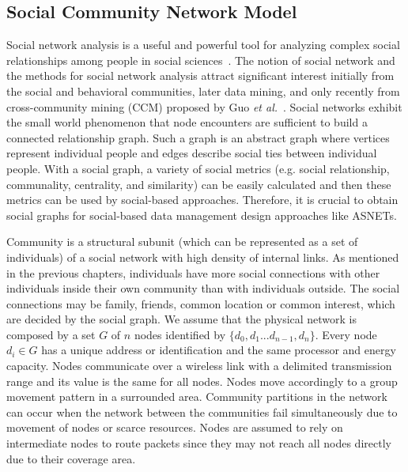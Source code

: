 \subsection{Social Community Network Model}\label{Chap4_03_01}
Social network analysis is a useful and powerful tool for analyzing complex social relationships among people in social sciences~\cite{OSerrat2009}. The notion of social network and the methods for social network analysis attract significant interest initially from the social and behavioral communities, later data mining, and only recently from cross-community mining (CCM) proposed by Guo {\it et al.}~\cite{BGuo2012}. Social networks exhibit the small world phenomenon that node encounters are sufficient to build a connected relationship graph. Such a graph is an abstract graph where vertices represent individual people and edges describe social ties between individual people. With a social graph, a variety of social metrics (e.g. social relationship, communality, centrality, and similarity) can be easily calculated and then these metrics can be used by social-based approaches. Therefore, it is crucial to obtain social graphs for social-based data management design approaches like ASNETs.

Community is a structural subunit (which can be represented as a set of individuals) of a social network with high density of internal links. As mentioned in the previous chapters, individuals have more social connections with other individuals inside their own community than with individuals outside. The social connections may be family, friends, common location or common interest, which are decided by the social graph. We assume that the physical network is composed by a set $G$ of $n$ nodes identified by $\{d_0, d_1 ... d_{n-1}, d_n\}$. Every node $d_i \in G$ has a unique address or identification and the same processor and energy capacity. Nodes communicate over a wireless link with a delimited transmission range and its value is the same for all nodes. Nodes move accordingly to a group movement pattern in a surrounded area. Community partitions in the network can occur when the network between the communities fail simultaneously due to movement of nodes or scarce resources. Nodes are assumed to rely on intermediate nodes to route packets since they may not reach all nodes directly due to their coverage area.

